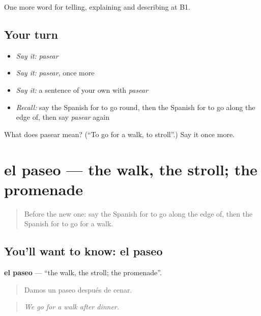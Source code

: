\begin{grammarlens}[title={What you've built}]
One more word for telling, explaining and describing at B1.
\end{grammarlens}

\subsection*{Your turn}
\begin{itemize}
\raggedright
  \item \emph{Say it:} \emph{pasear}
  \item \emph{Say it:} \emph{pasear}, once more
  \item \emph{Say it:} a sentence of your own with \emph{pasear}
  \item \emph{Recall:} say the Spanish for to go round, then the Spanish for to go along the edge of, then say \emph{pasear} again
\end{itemize}

\begin{tcolorbox}[breakable,colback=teal!4,colframe=teal!35!black,title={Before you move on}]
What does pasear mean? (\textquotedblleft{}To go for a walk, to stroll\textquotedblright{}.) Say it once more.
\end{tcolorbox}
\section[el paseo]{el paseo — the walk, the stroll; the promenade}

\label{lesson:ES-C674-paseo}



\begin{quote}
Before the new one: say the Spanish for to go along the edge of, then the Spanish for to go for a walk.
\end{quote}

\subsection*{You'll want to know: el paseo}
\textbf{el paseo} — \textquotedblleft{}the walk, the stroll; the promenade\textquotedblright{}.

\begin{quote}
Damos un paseo después de cenar.
\end{quote}

\begin{quote}
\emph{We go for a walk after dinner.}
\end{quote}

